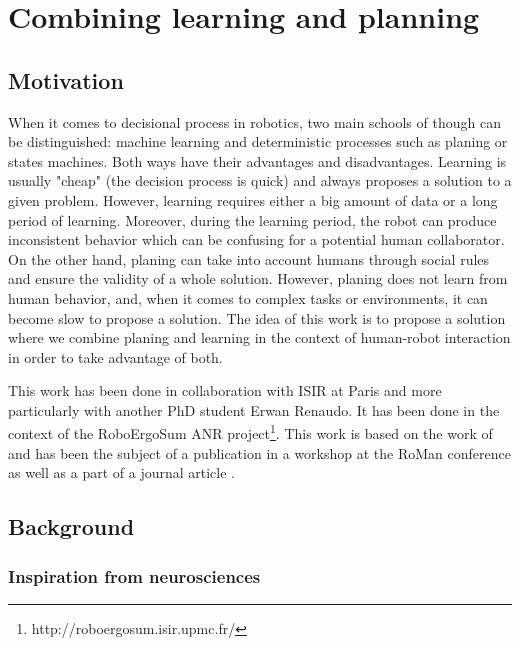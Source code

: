\documentclass[english,a4paper,11pt,twoside]{StyleThese}
\begin{document}
\setcounter{chapter}{6} %
\dominitoc
\faketableofcontents
\fi

\chapter{Combining learning and planning}
\minitoc

\label{ch:Learning}

\section{Motivation}

When it comes to decisional process in robotics, two main schools of though can be distinguished: machine learning and deterministic processes such as planing or states machines. Both ways have their advantages and disadvantages. Learning is usually "cheap" (the decision process is quick) and always proposes a solution to a given problem. However, learning requires either a big amount of data or a long period of learning. Moreover, during the learning period, the robot can produce inconsistent behavior which can be confusing for a potential human collaborator. On the other hand, planing can take into account humans through social rules and ensure the validity of a whole solution. However, planing does not learn from human behavior, and, when it comes to complex tasks or environments, it can become slow to propose a solution. The idea of this work is to propose a solution where we combine planing and learning in the context of human-robot interaction in order to take advantage of both. 

This work has been done in collaboration with ISIR at Paris and more particularly with another PhD student Erwan Renaudo. It has been done in the context of the RoboErgoSum ANR project\footnote{http://roboergosum.isir.upmc.fr/}. This work is based on the work of \cite{renaudo2014design} and has been the subject of a publication in a workshop at the RoMan conference \cite{renaudo2015learning} as well as a part of a journal article \cite{khamassi2016integration}.

\section{Background}

\subsection{Inspiration from neurosciences}
\end{document}
